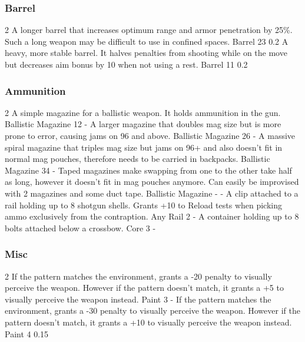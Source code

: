 \subsubsection{Barrel}
\vspace{8mm}
\begin{multicols}{2}
    {A longer barrel that increases optimum range and armor penetration by 25\%.
        Such a long weapon may be difficult to use in confined spaces.}
    {Barrel}
    {23}
    {0.2}
    {A heavy, more stable barrel.
        It halves penalties from shooting while on the move
        but decreases aim bonus by 10 when not using a rest.}
    {Barrel}
    {11}
    {0.2}
\end{multicols}

\subsubsection{Ammunition}
\vspace{8mm}
\begin{multicols}{2}
    {A simple magazine for a ballistic weapon.
        It holds ammunition in the gun.}
    {Ballistic Magazine}
    {12}
    {-}
    {A larger magazine that doubles mag size but is more prone to error,
        causing jams on 96 and above.}
    {Ballistic Magazine}
    {26}
    {-}
    {A massive spiral magazine that triples mag size
        but jams on 96+ and also doesn't fit in normal mag pouches,
        therefore needs to be carried in backpacks.}
    {Ballistic Magazine}
    {34}
    {-}
    {Taped magazines make swapping from one to the other take half as long,
        however it doesn't fit in mag pouches anymore.
        Can easily be improvised with 2 magazines and some duct tape.}
    {Ballistic Magazine}
    {-}
    {-}
    {A clip attached to a rail holding up to 8 shotgun shells.
        Grants +10 to Reload tests when picking ammo exclusively from the contraption.}
    {Any Rail}
    {2}
    {-}
    {A container holding up to 8 bolts attached below a crossbow.}
    {Core}
    {3}
    {-}
\end{multicols}

\subsubsection{Misc}
\vspace{8mm}
\begin{multicols}{2}
    {If the pattern matches the environment,
        grants a -20 penalty to visually perceive the weapon.
        However if the pattern doesn't match,
        it grants a +5 to visually perceive the weapon instead.}
    {Paint}
    {3}
    {-}
    {If the pattern matches the environment,
        grants a -30 penalty to visually perceive the weapon.
        However if the pattern doesn't match,
        it grants a +10 to visually perceive the weapon instead.}
    {Paint}
    {4}
    {0.15}
\end{multicols}


